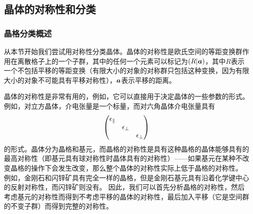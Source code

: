 \subsection{晶体的对称性和分类}

\subsubsection{晶格分类概述}

从本节开始我们尝试用对称性分类晶体。晶体的对称性是欧氏空间的等距变换群作用在离散格子上的一个子群，其中的任何一个元素可以标记为$(R|\vb*{a})$，其中$R$表示一个不包括平移的等距变换（有限大小的对象的对称群只包括这种变换，因为有限大小的对象不可能具有平移对称性），$\vb*{a}$表示平移的距离。

晶体的对称性是非常有用的，例如，它可以直接用于决定晶体的一些参数的形式。例如，对立方晶体，介电张量是一个标量，而对六角晶体介电张量具有
\[
    \pmqty{\dmat{\epsilon_\parallel, \epsilon_\bot, \epsilon_\bot}}
\]
的形式。晶体分为晶格和基元，而晶格的对称性是具有这种晶格的晶体能够具有的最高对称性（即基元具有球对称性时晶体具有的对称性）——如果基元在某种不改变晶格的操作下会发生改变，那么整个晶体的对称性实际上低于晶格的对称性。
例如，金刚石和闪锌矿具有完全一样的晶格，但是金刚石基元具有沿着化学键中心的反射对称性，而闪锌矿则没有。 %
因此，我们可以首先分析晶格的对称性，然后考虑基元的对称性而得到不考虑平移的晶体的对称性，最后加入平移（它是空间群的不变子群）而得到完整的对称性。

